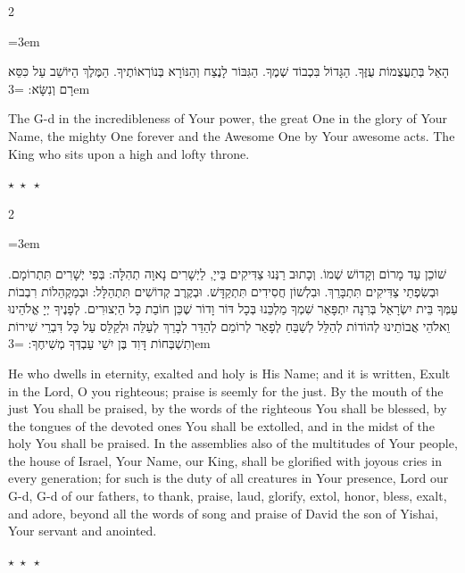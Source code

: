 \documentclass[11pt, openany]{book}
\newenvironment{bilingual}{%
  \par\vspace{4pt}%
  \begin{paracol}{2}%
}{%
  \end{paracol}%
  \par\vspace{2pt}%
}
\newenvironment{hebrewcol}{%
  \switchcolumn[1]%
  \begingroup
  \RTL
  \hebrewfont\large
  \setstretch{1.4}%
  \emergencystretch=3em
  \tolerance=9999
  \parindent=0pt\relax
}{%
  \endRTL
  \endgroup
}
\newenvironment{englishcol}{%
  \switchcolumn[0]%
  \begingroup
  \setstretch{1.4}%
  \emergencystretch=3em
  \tolerance=9999
  \normalsize
  \rightskip=0.12in\relax
}{%
  \endgroup
}
\newcommand{\parasep}{%
  \par\vspace{3pt}
  \begin{center}
    \textcolor{sedergold!50}{\small$\star\;\star\;\star$}
  \end{center}
  \par\vspace{3pt}
}
\begin{document}
\begin{bilingual}
\begin{hebrewcol}
הָאֵל בְּתַעֲצֻמוֹת עֻזֶּךָ. הַגָּדוֹל בִּכְבוֹד שְׁמֶךָ. הַגִּבּוֹר לָנֶצַח וְהַנּוֹרָא בְּנוֹרְאוֹתֶיךָ. הַמֶּלֶךְ הַיּוֹשֵׁב עַל כִּסֵּא רָם וְנִשָּׂא:
\end{hebrewcol}
\begin{englishcol}
The G-d in the incredibleness of Your power, the great One in the glory of Your Name, the mighty One forever and the Awesome One by Your awesome acts. The King who sits upon a high and lofty throne.
\end{englishcol}
\end{bilingual}
\parasep

\begin{bilingual}
\begin{hebrewcol}
שׁוֹכֵן עַד מָרוֹם וְקָדוֹשׁ שְׁמוֹ. וְכָתוּב רַנְּנוּ צַדִּיקִים בַּייָ, לַיְשָׁרִים נָאוָה תְהִלָּה: בְּפִי יְשָׁרִים תִּתְרוֹמָם. וּבְשִׂפְתֵי צַדִּיקִים תִּתְבָּרֵךְ. וּבִלְשׁוֹן חֲסִידִים תִּתְקַדָּשׁ. וּבְקֶרֶב קְדוֹשִׁים תִּתְהַלָּל: וּבְמַקְהֵלוֹת רִבְבוֹת עַמְּךָ בֵּית יִשְׂרָאֵל בְּרִנָּה יִתְפָּאֵר שִׁמְךָ מַלְכֵּנוּ בְּכָל דּוֹר וָדוֹר שֶׁכֵּן חוֹבַת כָּל הַיְצוּרִים. לְפָנֶיךָ יְיָ אֱלֹהֵינוּ וֵאלֹהֵי אֲבוֹתֵינוּ לְהוֹדוֹת לְהַלֵּל לְשַׁבֵּחַ לְפָאֵר לְרוֹמֵם לְהַדֵּר לְבָרֵךְ לְעַלֵּה וּלְקַלֵּס עַל כָּל דִּבְרֵי שִׁירוֹת וְתִשְׁבְּחוֹת דָּוִד בֶּן יִשַׁי עַבְדְּךָ מְשִׁיחֶךָ:
\end{hebrewcol}
\begin{englishcol}
He who dwells in eternity, exalted and holy is His Name; and it is written, Exult in the Lord, O you righteous; praise is seemly for the just. By the mouth of the just You shall be praised, by the words of the righteous You shall be blessed, by the tongues of the devoted ones You shall be extolled, and in the midst of the holy You shall be praised. In the assemblies also of the multitudes of Your people, the house of Israel, Your Name, our King, shall be glorified with joyous cries in every generation; for such is the duty of all creatures in Your presence, Lord our G-d, G-d of our fathers, to thank, praise, laud, glorify, extol, honor, bless, exalt, and adore, beyond all the words of song and praise of David the son of Yishai, Your servant and anointed.
\end{englishcol}
\end{bilingual}
\parasep
\end{document}
